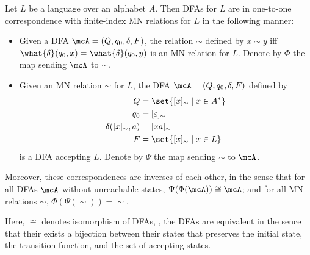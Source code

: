 \begin{proposition} \label{thm:mn:correspondence}
    Let $L$ be a language over an alphabet $A$.
    Then DFAs for $L$ are in one-to-one correspondence with finite-index MN
    relations for $L$ in the following manner:
    \begin{itemize}
        \item Given a DFA $\mcA = (Q, q_0, \delta, F)$, the relation $\sim$
        defined by $x \sim y$ iff
        $\what{\delta}(q_0, x) = \what{\delta}(q_0, y)$ is an MN relation
        for $L$.
        Denote by $\Phi$ the map sending $\mcA$ to $\sim$.
        \item Given an MN relation $\sim$ for $L$, the DFA $\mcA = (Q, q_0,
        \delta, F)$ defined by \begin{align*}
            Q &= \set{[x]_{\sim} \mid x \in A^*} \\
            q_0 &= [\varepsilon]_{\sim} \\
            \delta([x]_{\sim}, a) &= [xa]_{\sim} \\
            F &= \set{[x]_{\sim} \mid x \in L}
        \end{align*} is a DFA accepting $L$.
        Denote by $\Psi$ the map sending $\sim$ to $\mcA$.
    \end{itemize}
    Moreover, these correspondences are inverses of each other, in the sense
    that for all DFAs $\mcA$ without unreachable states,
    $\Psi(\Phi(\mcA)) \cong \mcA$; and for all MN relations $\sim$,
    $\Phi(\Psi(\sim)) = {\sim}$.

    Here, $\cong$ denotes isomorphism of DFAs, \ie, the DFAs are equivalent
    in the sence that their exists a bijection between their states that
    preserves the initial state, the transition function, and the set of
    accepting states.
\end{proposition}
